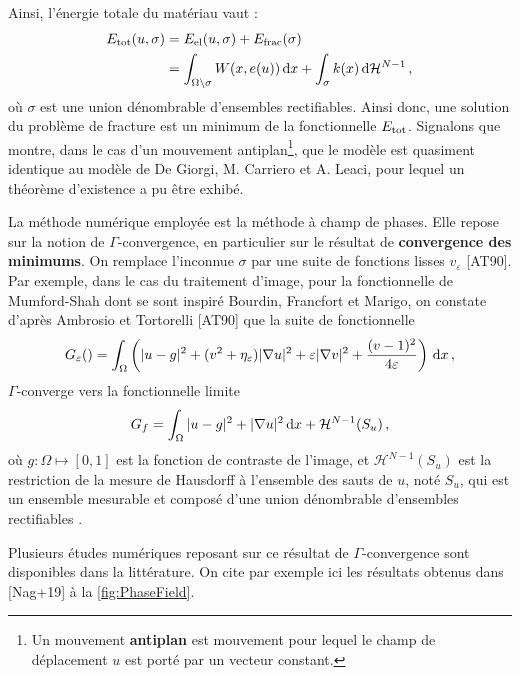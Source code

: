 Ainsi, l’énergie totale du matériau vaut :
\begin{align*}
\etot(u,\sigma) &= \eel(u,\sigma) + \efrac(\sigma) \\
&= \int_{\Omega \backslash \sigma} W(x,e(u)) \diff x + \int_{\sigma} k(x) \diff \mathcal{H}^{N-1} \,,
\end{align*}
où $\sigma$ est une union dénombrable d'ensembles rectifiables. Ainsi donc, une solution du problème de fracture est un minimum de la fonctionnelle $E_{\text{tot}}$. Signalons que \citeauthor{balasoiu2020thesis} montre, dans le cas d'un mouvement antiplan\footnote{Un mouvement \textbf{antiplan} est mouvement pour lequel le champ de déplacement $u$ est porté par un vecteur constant.}, que le modèle est quasiment identique au modèle de De Giorgi, M. Carriero et A. Leaci, pour lequel un théorème d'existence a pu être exhibé.

La méthode numérique employée est la méthode à champ de phases. Elle repose sur la notion de $\Gamma$-convergence, en particulier sur le résultat de \textbf{convergence des minimums}. On remplace l'inconnue $\sigma$ par une suite de fonctions lisses $v_\varepsilon$ [AT90]. Par exemple, dans le cas du traitement d'image, pour la fonctionnelle de Mumford-Shah dont se sont inspiré Bourdin, Francfort et Marigo, on constate d'après Ambrosio et Tortorelli [AT90] que la suite de fonctionnelle
$$
G_{\varepsilon}() = \int_{\Omega} \left( \vert u-g \vert^2 + (v^2 + \eta_{\varepsilon}) \vert \nabla u \vert^2 + \varepsilon \vert \nabla v \vert^2 + \frac{(v-1)^2}{4\varepsilon} \right) \diff x \,,
$$
$\Gamma$-converge vers la fonctionnelle limite 
$$
G_f = \int_{\Omega} \vert u-g \vert^2 + \vert \nabla u \vert^2 \diff x + \mathcal{H}^{N-1}(S_u) \,,
$$
où $g:\Omega \mapsto [0,1]$ est la fonction de contraste de l’image, et $\mathcal{H}^{N-1}(S_u)$ est la restriction de la mesure de Hausdorff à l’ensemble des sauts de $u$, noté $S_u$, qui est un ensemble mesurable et composé d’une union dénombrable d’ensembles rectifiables \parencite[pp.33-35]{balasoiu2020thesis}.

Plusieurs études numériques reposant sur ce résultat de $\Gamma$-convergence sont disponibles dans la littérature. On cite par exemple ici les résultats obtenus dans [Nag+19] à la \cref{fig:PhaseField}.

